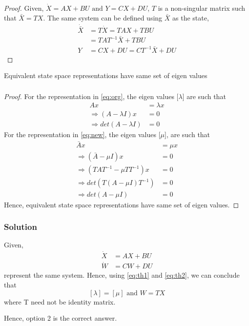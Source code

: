 \documentclass{beamer}
\begin{document}
\begin{frame}
\frametitle{}
\begin{proof}
Given, $\dot X=AX+BU \text{ and } Y=CX+DU$, $T$ is a non-singular matrix such that $\bar X= TX$. The same system can be defined using $\bar X$ as the state,
\begin{align}
    \dot{\bar X}&=T\dot X=TAX+TBU\\
    &=TAT^{-1}\bar X+TBU\\
    Y&=CX+DU=CT^{-1}\bar X+DU
\end{align}
\end{proof}
\begin{theorem}
Equivalent state space representations have same set of eigen values
\label{eq:th2}
\end{theorem}
\end{frame}

\begin{frame}
\frametitle{}
\begin{proof}
For the representation in \eqref{eq:org}, the eigen values [$\lambda$] are such that
\begin{align}
    Ax&=\lambda x\\
    \Rightarrow(A-\lambda I)x&=0\\
    \Rightarrow det(A-\lambda I)&=0
\end{align}
For the representation in \eqref{eq:new}, the eigen values [$\mu$], are such that
\begin{align}
    \bar Ax&=\mu x\\
    \Rightarrow(\bar A-\mu I)x&=0\\
    \Rightarrow(TAT^{-1}-\mu TT^{-1})x&=0\\
    \Rightarrow det(T(A-\mu I)T^{-1})&=0\\
    \Rightarrow det(A-\mu I)&=0
\end{align}
Hence, equivalent state space representations have same set of eigen values.
\end{proof}
\end{frame}

\begin{frame}
\frametitle{Solution}
Given,
\begin{align}
    \dot X&=AX+BU \\
    \dot W&=CW+DU
\end{align}
represent the same system. Hence, using \eqref{eq:th1} and \eqref{eq:th2}, we can conclude that
$$[\lambda]=[\mu] \text{ and } W=TX$$
where T need not be identity matrix.


Hence, option 2 is the correct answer.
\end{frame}
\end{document}
